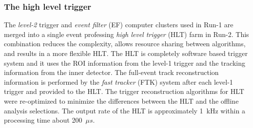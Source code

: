 
\subsubsection{The high level trigger}
\label{subsubsec:ae_HLT}
The \textit{level-2} trigger and \textit{event filter} (EF) computer clusters used in Run-1 are merged into a single event professing \textit{high level trigger} (HLT) farm in Run-2.
This combination reduces the complexity, allows resource sharing between algorithms, and results in a more flexible HLT.
The HLT is completely software based trigger system and it uses the ROI information from the level-1 trigger and the tracking information from the inner detector.
The full-event track reconstruction information is performed by the \textit{fast tracker} (FTK) system after each level-1 trigger and provided to the HLT.	 
The trigger reconstruction algorithms for HLT were re-optimized to minimize the differences between the HLT and the offline analysis selections.
The output rate of the HLT is approximately 1~kHz within a processing time about 200~$\mu s$.
